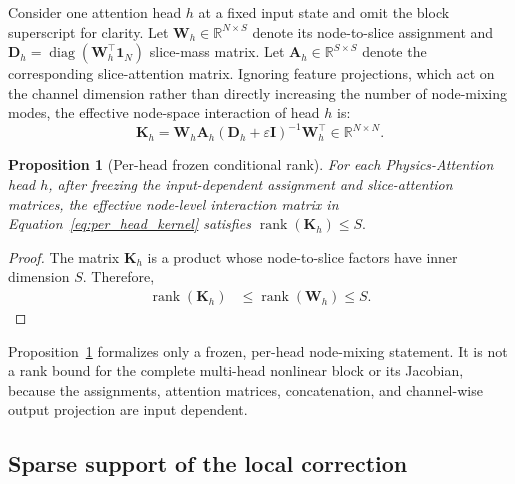 \documentclass[a4paper,fleqn]{cas-sc}
\newtheorem{proposition}{Proposition}[section]
\begin{document}
Consider one attention head \(h\) at a fixed input state and omit the block superscript for clarity. Let $\mathbf{W}_h\in\mathbb R^{N\times S}$ denote its node-to-slice assignment and $ \mathbf{D}_h
    =
    \operatorname{diag}
    \left(
        \mathbf W_h^{\top}\mathbf 1_N
    \right)$ slice-mass matrix. Let \(\mathbf A_h\in\mathbb R^{S\times S}\) denote the corresponding slice-attention matrix. Ignoring feature projections, which act on the channel dimension rather than directly increasing the number of node-mixing modes, the effective node-space interaction of head \(h\) is:
\begin{equation}
    \mathbf K_h
    =
    \mathbf W_h
    \mathbf A_h
    \left(
        \mathbf D_h+\varepsilon\mathbf I
    \right)^{-1}
    \mathbf W_h^{\top}
    \in\mathbb R^{N\times N}.
    \label{eq:per_head_kernel}
\end{equation}

\begin{proposition}[Per-head frozen conditional rank]
\label{prop:per_head_rank}
For each Physics-Attention head \(h\), after freezing the input-dependent assignment and slice-attention matrices, the effective node-level interaction matrix in Equation~\eqref{eq:per_head_kernel} satisfies $ \operatorname{rank}(\mathbf K_h)
    \leq S.$
\end{proposition}

\begin{proof}
The matrix \(\mathbf K_h\) is a product whose node-to-slice factors have
inner dimension \(S\). Therefore,
\begin{equation}
\begin{aligned}
    \operatorname{rank}(\mathbf K_h)
    &\leq
    \operatorname{rank}(\mathbf W_h) \leq S.
\end{aligned}
\end{equation}

\end{proof}

Proposition~\ref{prop:per_head_rank} formalizes only a frozen, per-head node-mixing statement. It is not a rank bound for the complete multi-head nonlinear block or its Jacobian, because the assignments, attention matrices, concatenation, and channel-wise output projection are input dependent.

\subsection{Sparse support of the local correction}
\label{subsec:sparse_local_support}
\end{document}
